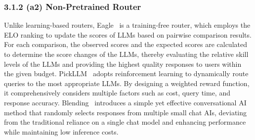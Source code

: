 \documentclass{article}
\begin{document}
\subsubsection{3.1.2 (a2) Non-Pretrained Router}
Unlike learning-based routers, Eagle~\cite{zhao2024eagle} is a training-free router, which employs the ELO ranking to update the scores of LLMs based on pairwise comparison results. 
For each comparison, the observed scores and the expected scores are calculated to determine the score changes of the LLMs, thereby evaluating the relative skill levels of the LLMs and providing the highest quality responses to users within the given budget.
PickLLM~\cite{sikeridis2024pickllm} adopts reinforcement learning to dynamically route queries to the most appropriate LLMs. By designing a weighted reward function, it comprehensively considers multiple factors such as cost, query time, and response accuracy.
Blending~\cite{lu2024blending} introduces a simple yet effective conversational AI method that randomly selects responses from multiple small chat AIs, deviating from the traditional reliance on a single chat model and enhancing performance while maintaining low inference costs.













\setlength{\cmidrulewidth}{0.01em}  
\end{document}
